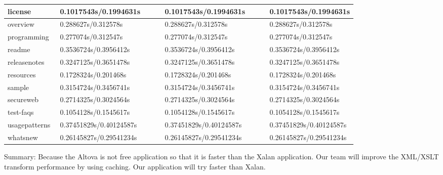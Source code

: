 \documentclass[letterpaper,10pt,titlepage]{article}
\begin{document}
\begin{longtable}{ | p{0.15\linewidth} | p{0.3\linewidth} | p{0.3\linewidth} | p{0.3\linewidth} |}
    \hline
    license &
    0.1017543s/0.1994631s &
    0.1017543s/0.1994631s &
    0.1017543s/0.1994631s \\
    \hline
    overview &
    0.288627s/0.312578s &
    0.288627s/0.312578s &
    0.288627s/0.312578s \\
    \hline
    programming &
    0.277074s/0.312547s &
    0.277074s/0.312547s &
    0.277074s/0.312547s \\
    \hline
    readme &
    0.3536724s/0.3956412s &
    0.3536724s/0.3956412s &
    0.3536724s/0.3956412s \\
    \hline
    releasenotes &
    0.3247125s/0.3651478s &
    0.3247125s/0.3651478s &
    0.3247125s/0.3651478s \\
    \hline
    resources &
    0.1728324s/0.201468s &
    0.1728324s/0.201468s &
    0.1728324s/0.201468s \\
    \hline
    sample &
    0.3154724s/0.3456741s &
    0.3154724s/0.3456741s &
    0.3154724s/0.3456741s \\
    \hline
    secureweb &
    0.2714325s/0.3024564s &
    0.2714325s/0.3024564s &
    0.2714325s/0.3024564s \\
    \hline
    test-faqs &
    0.1054128s/0.1545617s &
    0.1054128s/0.1545617s &
    0.1054128s/0.1545617s \\
    \hline
    usagepatterns &
    0.37451829s/0.40124587s &
    0.37451829s/0.40124587s &
    0.37451829s/0.40124587s \\
    \hline
    whatsnew &
    0.26145827s/0.29541234s &
    0.26145827s/0.29541234s &
    0.26145827s/0.29541234s \\
    \hline
\end{longtable}

Summary:
Because the Altova is not free application so that it is faster than the Xalan application.
Our team will improve the XML/XSLT transform performance by using caching. 
Our application will try faster than Xalan. 


\newpage
\end{document}
